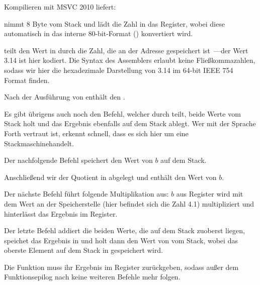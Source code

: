 
Kompilieren mit MSVC 2010 liefert:



\FLD nimmt 8 Byte vom Stack und lädt die Zahl in das  Register, wobei
diese automatisch in das interne 80-bit-Format ()
konvertiert wird.

\FDIV teilt den Wert in  durch die Zahl, die an der Adresse
 gespeichert ist~---der Wert 3.14 ist hier
kodiert.
Die Syntax des Assemblers erlaubt keine Fließkommazahlen, sodass wir hier die
hexadezimale Darstellung von 3.14 im 64-bit IEEE 754 Format finden.

Nach der Ausführung von \FDIV enthält  den .

Es gibt übrigens auch noch den \FDIVP Befehl, welcher  durch 
teilt, beide Werte vom Stack holt und das Ergebnis ebenfalls auf dem Stack
ablegt.
Wer mit der Sprache Forth \FNURLFORTH vertraut ist, erkennt schnell, dass es sich
hier um eine Stackmaschine\FNURLSTACK handelt.

Der nachfolgende \FLD Befehl speichert den Wert von $b$ auf dem Stack.

Anschließend wir der Quotient in  abgelegt und  enthält den Wert von
$b$.

Der nächste \FMUL Befehl führt folgende Multiplikation aus: $b$ aus Register
 wird mit dem Wert an der Speicherstelle 
(hier befindet sich die Zahl 4.1) multipliziert und hinterlässt das Ergebnis im
 Register.

Der letzte \FADDP Befehl addiert die beiden Werte, die auf dem Stack zuoberst
liegen, speichet das Ergebnis in  und holt dann den Wert von  vom
Stack, wobei das oberste Element auf dem Stack in  gespeichert wird.

Die Funktion muss ihr Ergebnis im  Register zurückgeben, sodass außer dem
Funktionsepilog nach \FADDP keine weiteren Befehle mehr folgen.


